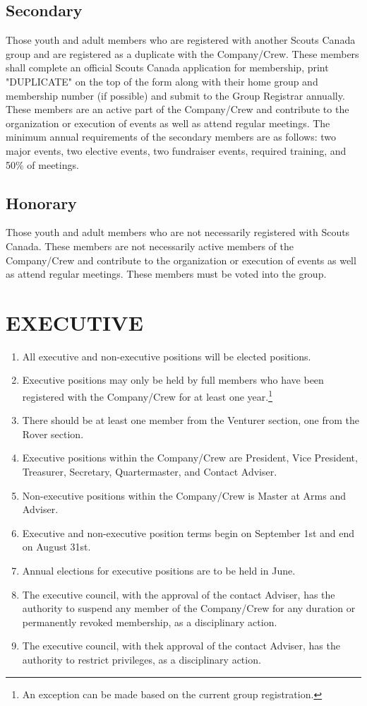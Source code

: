 \documentclass{Service_Corps_Document}
\begin{document}
\subsection{Secondary}
Those youth and adult members who are registered with another Scouts Canada group and are registered as a duplicate with the Company/Crew. These members shall complete an official Scouts Canada application for membership, print "DUPLICATE" on the top of the form along with their home group and membership number (if possible) and submit to the Group Registrar annually. These members are an active part of the Company/Crew and contribute to the organization or execution of events as well as attend regular meetings. The minimum annual requirements of the secondary members are as follows: two major events, two elective events, two fundraiser events, required training, and 50\% of meetings. 
\subsection{Honorary}
Those youth and adult members who are not necessarily registered with Scouts Canada. These members are not necessarily active members of the Company/Crew and contribute to the organization or execution of events as well as attend regular meetings. These members must be voted into the group.
\section{EXECUTIVE}
\begin{enumerate}
	\item All executive and non-executive positions will be elected positions.
	\item Executive positions may only be held by full members who have been registered with the Company/Crew for at least one year.\footnote{An exception can be made based on the current group registration.}
	\item There should be at least one member from the Venturer section, one from the Rover section. \footnotemark[\value{footnote}]
	\item Executive positions within the Company/Crew are President, Vice President, Treasurer, Secretary, Quartermaster, and Contact Adviser.
	\item Non-executive positions within the Company/Crew is Master at Arms and Adviser. 
	\item Executive and non-executive position terms begin on September 1st and end on August 31st.
	\item Annual elections for executive positions are to be held in June.
	\item The executive council, with the approval of the contact Adviser, has the authority to suspend any member of the Company/Crew for any duration or permanently revoked membership, as a disciplinary action.
	\item The executive council, with thek approval of the contact Adviser, has the authority to restrict privileges, as a disciplinary action.
\end{enumerate}
\end{document}
